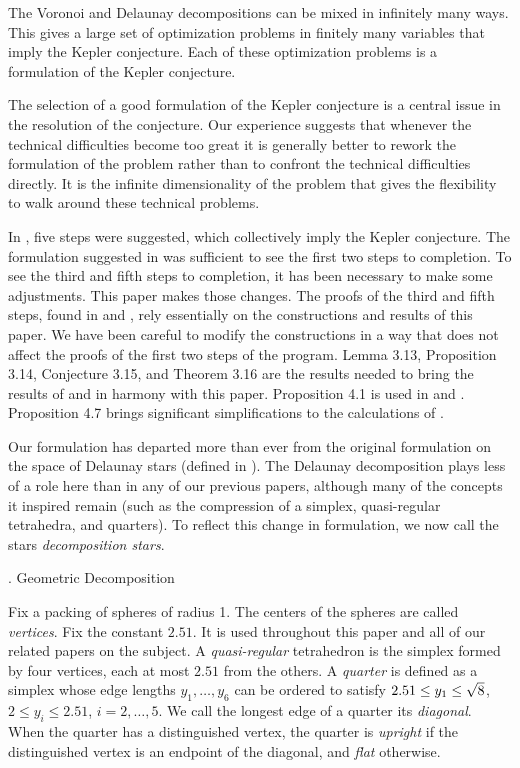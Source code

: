 The Voronoi and Delaunay decompositions can be mixed 
in infinitely many ways.  This gives a large set
of optimization problems in finitely many variables
that imply the Kepler conjecture.  Each of these optimization
problems is a formulation of the Kepler conjecture.

The selection of a good formulation of the Kepler conjecture
is a central issue in the resolution of the conjecture.
Our experience suggests that
whenever the technical difficulties become too great it is
generally better to rework the formulation of the problem
rather than to confront the technical difficulties directly.
It is the infinite dimensionality of the problem that
gives the flexibility to walk around these technical problems.

In \cite{I}, five steps were suggested, which collectively imply
the Kepler conjecture.  The formulation suggested in \cite{I}
was sufficient to see the first two steps to completion.
To see the third and fifth steps to completion, it has been
necessary to make some adjustments.
This paper makes those changes.  The proofs of the third and
fifth steps, found in \cite{III} and \cite{V}, rely essentially
on the constructions and results of this paper.  We have been
careful to modify the constructions in a way that does not 
affect the proofs of the first two steps of the program.  Lemma
3.13, Proposition 3.14, Conjecture 3.15, and Theorem 3.16 are the results
needed to bring the results of \cite{I} and \cite{II} in 
harmony with this paper.  Proposition 4.1 is used in \cite{III}
and \cite{V}.  Proposition 4.7 brings significant simplifications
to the calculations of \cite{III}.  

Our formulation has departed more than ever from the original
formulation on the space of Delaunay stars (defined in \cite{H1}).
The Delaunay decomposition plays less of a role here than in
any of our previous papers, although many of the concepts it
inspired remain (such as the compression of a simplex,
quasi-regular tetrahedra, and quarters).  
To reflect this change in formulation, we now call the
stars {\it decomposition stars}.

. Geometric Decomposition\endhead

Fix a packing of spheres of radius 1.  
The centers of
the spheres are called  {\it vertices}.  Fix the constant
$2.51$.  It is used throughout this paper and all of our
related papers on the subject.  A {\it quasi-regular\/}
tetrahedron is the simplex formed by four vertices,
 each at most $2.51$ from
the others.  
A {\it quarter\/} is defined as a 
simplex whose edge lengths $y_1,\ldots,y_6$ can be ordered to
satisfy $2.51\le y_1\le \sqrt8$, $2\le y_i\le 2.51$, $i=2,\ldots,5$.
We call the longest 
edge of a quarter its {\it diagonal\/}.
When the quarter has a distinguished vertex, the
quarter is {\it upright\/} if the distinguished vertex is an endpoint
of the diagonal, and {\it flat\/} otherwise.

